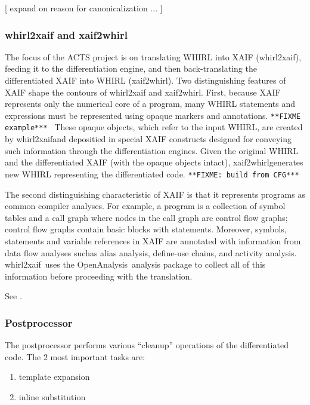 \documentclass[acmtocl,acmnow]{acmtrans2m}
\newcommand{\OpenAnalysis}{OpenAnalysis}
\newcommand{\whirlToxaif}{whirl2xaif}
\newcommand{\xaifTowhirl}{xaif2whirl}
\begin{document}
[ expand on reason for canonicalization ... ]

\subsubsection*{whirl2xaif and xaif2whirl}

The focus of the ACTS project is on translating WHIRL into XAIF
(\whirlToxaif), feeding it to the differentiation engine, and then
back-translating the differentiated XAIF into WHIRL (\xaifTowhirl).
Two distinguishing features of XAIF shape the contours of \whirlToxaif
and \xaifTowhirl.  First, because XAIF represents only the numerical
core of a program, many WHIRL statements and expressions must be
represented using opaque markers and annotations.  
{\tt ***FIXME example*** } 
These opaque objects, which refer to the input WHIRL, are created by
\whirlToxaif and depositied in special XAIF constructs designed for
conveying such information through the differentiation engines.  Given
the original WHIRL and the differentiated XAIF (with the opaque
objects intact), \xaifTowhirl generates new WHIRL representing the
differentiated code. {\tt ***FIXME: build from CFG***}

The second distinguishing characteristic of XAIF is that it represents
programs as common compiler analyses.  For example, a program is a
collection of symbol tables and a call graph where nodes in the call
graph are control flow graphs; control flow graphs contain basic
blocks with statements.  Moreover, symbols, statements and variable
references in XAIF are annotated with information from data flow
analyses suchas alias analysis, define-use chains, and activity
analysis.  \whirlToxaif\ uses the \OpenAnalysis\ analysis package to
collect all of this information before proceeding with the
translation.

See \cite{Rice Tech report}.


\subsubsection*{Postprocessor}
The postprocessor performs various ``cleanup'' operations of the
differentiated code. The 2 most important tasks are:

   \begin{enumerate}
      \item template expansion
      \item inline substitution
   \end{enumerate}
\end{document}
